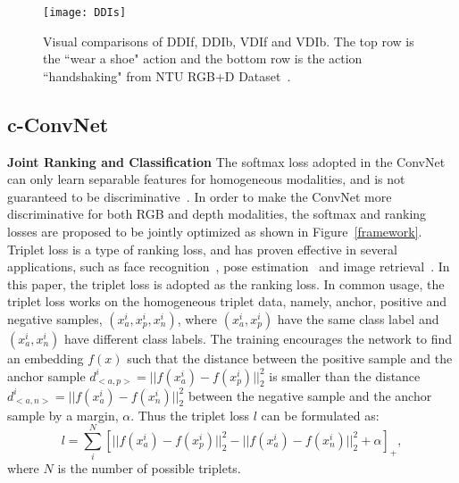 \documentclass[letterpaper]{article} %
\begin{document}
\begin{figure}[t]
\begin{center}{\texttt{[image: DDIs]}}
\end{center}
\caption{Visual comparisons of DDIf, DDIb, VDIf and VDIb.
The top row is the ``wear a shoe" action and the bottom row is
the action ``handshaking" from NTU RGB+D Dataset~\cite{shahroudy2016ntu}.   }
\label{DDIs}
\end{figure}

\subsection{c-ConvNet}

\textbf{Joint Ranking and Classification}
The softmax loss adopted in the ConvNet can only learn separable features for homogeneous modalities, and is not guaranteed to be discriminative~\cite{wen2016discriminative}. In order to make the ConvNet more
discriminative for both RGB and depth modalities, the softmax and ranking losses are proposed to be jointly optimized as shown in
Figure~\ref{framework}. Triplet loss is a type of ranking loss, and has proven effective in several applications, such as face
recognition~\cite{schroff2015facenet,liu2016transferring}, pose estimation~\cite{kwak2016thin} and image retrieval~\cite{Jiang2016}. In this paper, the triplet loss is adopted as the ranking loss.  In common usage,
the triplet loss works on the homogeneous triplet data, namely, anchor, positive
and negative samples,  $(x_{a}^{i},x_{p}^{i},x_{n}^{i})$, where
$(x_{a}^{i},x_{p}^{i})$ have the same class label and $(x_{a}^{i},x_{n}^{i})$
have different class labels. The training encourages the network to find an
embedding $f(x)$ such that the distance between the positive sample and the anchor
sample $d_{<a,p>}^{i} = ||f(x_{a}^{i}) - f(x_{p}^{i})||_{2}^{2}$ is smaller than
the distance $d_{<a,n>}^{i} = ||f(x_{a}^{i}) - f(x_{n}^{i})||_{2}^{2}$ between
the negative sample and the anchor sample by a margin, $\alpha$.  Thus the triplet loss
$l$ can be formulated as:
\begin{equation}\label{1}
l = \sum_{i}^{N}[||f(x_{a}^{i}) - f(x_{p}^{i})||_{2}^{2} - ||f(x_{a}^{i}) - f(x_{n}^{i})||_{2}^{2} + \alpha]_{+},
\end{equation}
where $N$ is the number of possible triplets.
\end{document}
